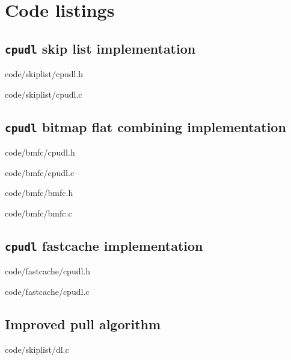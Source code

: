 \appendix

\chapter{Code listings}\label{chap:codelst}

\section{\texttt{cpudl} skip list implementation}\label{sec:cpudl_skiplist_code}

{code/skiplist/cpudl.h}

{code/skiplist/cpudl.c}

\section{\texttt{cpudl} bitmap flat combining implementation}\label{sec:cpudl_bm_fc_code}

{code/bmfc/cpudl.h}

{code/bmfc/cpudl.c}

{code/bmfc/bmfc.h}

{code/bmfc/bmfc.c}

\section{\texttt{cpudl} fastcache implementation}\label{sec:cpudl_fastcache_code}

{code/fastcache/cpudl.h}

{code/fastcache/cpudl.c}

\section{Improved pull algorithm}\label{sec:improved_pull_code}

{code/skiplist/dl.c}
